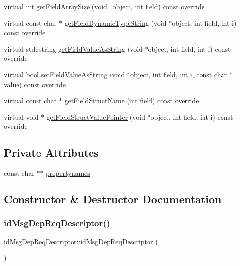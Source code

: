 \begin{DoxyCompactItemize}
virtual int \hyperlink{classidMsgDepReqDescriptor_a0f2d677c4de9aeba53ecddf2882f43be}{get\+Field\+Array\+Size} (void $\ast$object, int field) const override
\item 
virtual const char $\ast$ \hyperlink{classidMsgDepReqDescriptor_aa9030f9516d216af76ee08d6eeaa9dc3}{get\+Field\+Dynamic\+Type\+String} (void $\ast$object, int field, int i) const override
\item 
virtual std\+::string \hyperlink{classidMsgDepReqDescriptor_a01154250296e827bb3b46ffd9356d403}{get\+Field\+Value\+As\+String} (void $\ast$object, int field, int i) const override
\item 
virtual bool \hyperlink{classidMsgDepReqDescriptor_ada3744fcc0b6cb75a519a5ecf5d3cebf}{set\+Field\+Value\+As\+String} (void $\ast$object, int field, int i, const char $\ast$value) const override
\item 
virtual const char $\ast$ \hyperlink{classidMsgDepReqDescriptor_a9a0b0a69461b1f301f0d1e2d64c61f21}{get\+Field\+Struct\+Name} (int field) const override
\item 
virtual void $\ast$ \hyperlink{classidMsgDepReqDescriptor_a4149a26c3c60d977e462bdf3a91241d4}{get\+Field\+Struct\+Value\+Pointer} (void $\ast$object, int field, int i) const override
\end{DoxyCompactItemize}
\subsection*{Private Attributes}
\begin{DoxyCompactItemize}
\item 
const char $\ast$$\ast$ \hyperlink{classidMsgDepReqDescriptor_a12975f508bbf2bdd01210c819adee638}{propertynames}
\end{DoxyCompactItemize}


\subsection{Constructor \& Destructor Documentation}
\mbox{\label{classidMsgDepReqDescriptor_a2f3ef90d3ded0e3218bbd9577c207dfa}} 
\subsubsection{\texorpdfstring{id\+Msg\+Dep\+Req\+Descriptor()}{idMsgDepReqDescriptor()}}
{\footnotesize\ttfamily id\+Msg\+Dep\+Req\+Descriptor\+::id\+Msg\+Dep\+Req\+Descriptor (\begin{DoxyParamCaption}{ }\end{DoxyParamCaption})}


